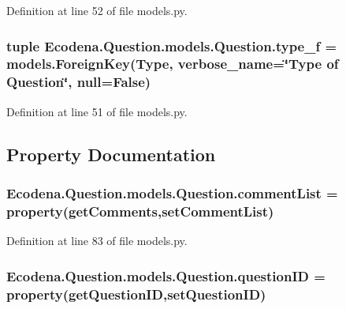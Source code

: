 Definition at line 52 of file models.py.

\hypertarget{class_ecodena_1_1_question_1_1models_1_1_question_ae09f8ef0052f7c65df2383940124d5ce}{
\subsubsection[{type\_\-f}]{\setlength{\rightskip}{0pt plus 5cm}tuple {\bf Ecodena.Question.models.Question.type\_\-f} = models.ForeignKey({\bf Type}, verbose\_\-name=\char`\"{}Type of {\bf Question}\char`\"{}, null=False)}}
\label{d1/d67/class_ecodena_1_1_question_1_1models_1_1_question_ae09f8ef0052f7c65df2383940124d5ce}


Definition at line 51 of file models.py.



\subsection{Property Documentation}
\hypertarget{class_ecodena_1_1_question_1_1models_1_1_question_a932bd57bcdb185606aa6889ae0880a57}{
\subsubsection[{commentList}]{\setlength{\rightskip}{0pt plus 5cm}Ecodena.Question.models.Question.commentList = property(getComments,setCommentList)}}
\label{d1/d67/class_ecodena_1_1_question_1_1models_1_1_question_a932bd57bcdb185606aa6889ae0880a57}


Definition at line 83 of file models.py.

\hypertarget{class_ecodena_1_1_question_1_1models_1_1_question_a24c1bdd9f3464af160aa43c9c224f19a}{
\subsubsection[{questionID}]{\setlength{\rightskip}{0pt plus 5cm}Ecodena.Question.models.Question.questionID = property(getQuestionID,setQuestionID)}}
\label{d1/d67/class_ecodena_1_1_question_1_1models_1_1_question_a24c1bdd9f3464af160aa43c9c224f19a}


